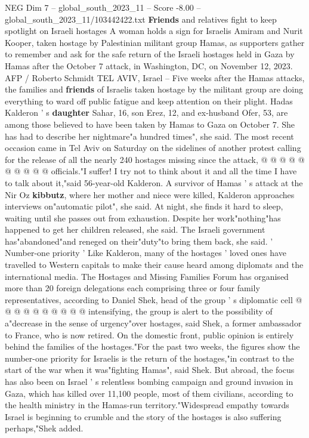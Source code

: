 \begin{textsample}{NEG Dim 7 – global\_south\_2023\_11 – Score -8.00 – global\_south\_2023\_11/103442422.txt}  \label{ex:f7_neg_322}
\textbf{Friends} and relatives fight to keep spotlight on Israeli hostages A woman holds a sign for Israelis Amiram and Nurit Kooper, taken hostage by Palestinian militant group Hamas, as supporters gather to remember and ask for the safe return of the Israeli hostages held in Gaza by Hamas after the October 7 attack, in Washington, DC, on November 12, 2023.
AFP / Roberto Schmidt TEL AVIV, Israel -- Five weeks after the Hamas attacks, the families and \textbf{friends} of Israelis taken hostage by the militant group are doing everything to ward off public fatigue and keep attention on their plight.
Hadas Kalderon ' s \textbf{daughter} Sahar, 16, son Erez, 12, and ex-husband Ofer, 53, are among those believed to have been taken by Hamas to Gaza on October 7.
She has had to describe her nightmare"a hundred times", she said.
The most recent occasion came in Tel Aviv on Saturday on the sidelines of another protest calling for the release of all the nearly 240 hostages missing since the attack, @ @ @ @ @ @ @ @ @ @ officials."I suffer!
I try not to think about it and all the time I have to talk about it,"said 56-year-old Kalderon.
A survivor of Hamas ' s attack at the Nir Oz \textbf{kibbutz}, where her mother and niece were killed, Kalderon approaches interviews on"automatic pilot", she said.
At night, she finds it hard to sleep, waiting until she passes out from exhaustion.
Despite her work"nothing"has happened to get her children released, she said.
The Israeli government has"abandoned"and reneged on their"duty"to bring them back, she said. ' Number-one priority ' Like Kalderon, many of the hostages ' loved ones have travelled to Western capitals to make their cause heard among diplomats and the international media.
The Hostages and Missing Families Forum has organised more than 20 foreign delegations each comprising three or four family representatives, according to Daniel Shek, head of the group ' s diplomatic cell @ @ @ @ @ @ @ @ @ @ intensifying, the group is alert to the possibility of a"decrease in the sense of urgency"over hostages, said Shek, a former ambassador to France, who is now retired.
On the domestic front, public opinion is entirely behind the families of the hostages."For the past two weeks, the figures show the number-one priority for Israelis is the return of the hostages,"in contrast to the start of the war when it was"fighting Hamas", said Shek.
But abroad, the focus has also been on Israel ' s relentless bombing campaign and ground invasion in Gaza, which has killed over 11,100 people, most of them civilians, according to the health ministry in the Hamas-run territory."Widespread empathy towards Israel is beginning to crumble and the story of the hostages is also suffering perhaps,"Shek added.

\end{textsample}
